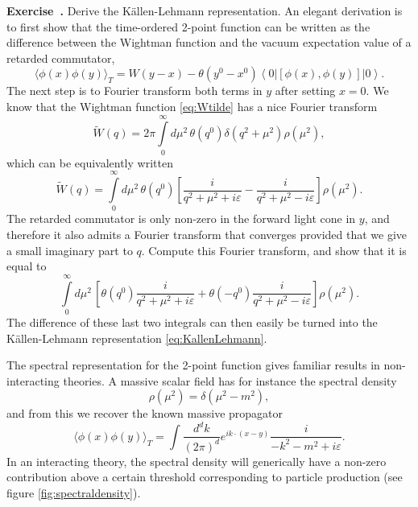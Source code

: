 \documentclass[a4paper,12pt]{article}
\newcommand{\ket}[1]{\left| #1 \right\rangle}
\newcommand{\bra}[1]{\left\langle #1 \right|}
\numberwithin{equation}{section}
\newcounter{exercise}[section]
\newenvironment{exercise}[1][]%
	{\refstepcounter{exercise}\bigskip
	\begin{mdframed}[backgroundcolor=gray!20, linewidth=0]
	\noindent\textbf{Exercise~\thesection.\theexercise #1} \rmfamily}
  	{\end{mdframed}\bigskip}
\begin{document}
\begin{exercise}
	Derive the Källen-Lehmann representation.
	An elegant derivation is to first show that the 
	time-ordered 2-point function can be written as the difference
	between the Wightman function and the vacuum expectation value
	of a retarded commutator,
	$$
	\langle \phi(x) \phi(y) \rangle_T
	= 
	W(y - x)
	- \theta(y^0 - x^0)
	\bra{0} \left[ \phi(x), \phi(y) \right] \ket{0}.
	$$
	The next step is to Fourier transform both terms in $y$
	after setting $x = 0$.
	We know that the Wightman function \eqref{eq:Wtilde}
	has a nice Fourier transform
	$$
		\widetilde{W}(q)
		= 2\pi \int\limits_0^\infty d\mu^2 \,
		\theta(q^0) 
		\delta(q^2 + \mu^2) \rho(\mu^2),
	$$
	which can be equivalently written
	$$
		\widetilde{W}(q)
		= \int\limits_0^\infty d\mu^2 \,
		\theta(q^0) 
		\left[ \frac{i}{q^2 + \mu^2 + i \varepsilon}
		- \frac{i}{q^2 + \mu^2 - i \varepsilon} \right] \rho(\mu^2).
	$$
	The retarded commutator is only non-zero in the forward light cone
	in $y$, and therefore it also admits a Fourier transform
	that converges provided that we give a small imaginary part to $q$.
	Compute this Fourier transform, and show that it is equal to
	$$
		\int\limits_0^\infty d\mu^2 \,
		\left[ \theta(q^0) \frac{i}{q^2 + \mu^2 + i \varepsilon}
		+ \theta(-q^0) \frac{i}{q^2 + \mu^2 - i \varepsilon}
		\right] \rho(\mu^2).
	$$
	The difference of these last two integrals can then easily be
	turned into the Källen-Lehmann representation
	\eqref{eq:KallenLehmann}.
\end{exercise}
%
The spectral representation for the 2-point function gives familiar results in non-interacting theories. A massive scalar field has for instance the spectral density
\begin{equation}
	\rho(\mu^2) = \delta(\mu^2 - m^2),
\end{equation}
and from this we recover the known massive propagator
\begin{equation}
	\langle \phi(x) \phi(y) \rangle_T
	= \int \frac{d^dk}{(2\pi)^d}
	e^{i k \cdot (x - y)}
	\frac{i}
	{-k^2 - m^2 + i \varepsilon}.
\end{equation}
In an interacting theory, the spectral density will generically have a non-zero contribution above a certain threshold corresponding to particle production (see figure \ref{fig:spectraldensity}).
\end{document}
